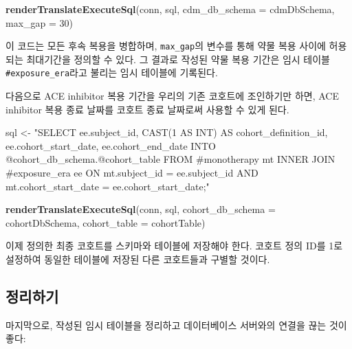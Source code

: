 \documentclass[11pt]{book}
\newenvironment{Shaded}{\begin{snugshade}}{\end{snugshade}}
\newcommand{\KeywordTok}[1]{\textcolor[rgb]{0.13,0.29,0.53}{\textbf{#1}}}
\newcommand{\DataTypeTok}[1]{\textcolor[rgb]{0.13,0.29,0.53}{#1}}
\newcommand{\DecValTok}[1]{\textcolor[rgb]{0.00,0.00,0.81}{#1}}
\newcommand{\StringTok}[1]{\textcolor[rgb]{0.31,0.60,0.02}{#1}}
\newcommand{\NormalTok}[1]{#1}
\theoremstyle{definition}
\theoremstyle{definition}
\theoremstyle{definition}
\theoremstyle{remark}
\begin{document}
\begin{Shaded}
\begin{Highlighting}[]
\KeywordTok{renderTranslateExecuteSql}\NormalTok{(conn,}
\NormalTok{                          sql,}
                          \DataTypeTok{cdm_db_schema =}\NormalTok{ cdmDbSchema,}
                          \DataTypeTok{max_gap =} \DecValTok{30}\NormalTok{)}
\end{Highlighting}
\end{Shaded}

이 코드는 모든 후속 복용을 병합하며, \texttt{max\_gap}의 변수를 통해
약물 복용 사이에 허용되는 최대기간을 정의할 수 있다. 그 결과로 작성된
약물 복용 기간은 임시 테이블 \texttt{\#exposure\_era}라고 불리는 임시
테이블에 기록된다.

다음으로 ACE inhibitor 복용 기간을 우리의 기존 코호트에 조인하기만 하면,
ACE inhibitor 복용 종료 날짜를 코호트 종료 날짜로써 사용할 수 있게 된다.

\begin{Shaded}
\begin{Highlighting}[]
\NormalTok{sql <-}\StringTok{ "SELECT ee.subject_id,}
\StringTok{  CAST(1 AS INT) AS cohort_definition_id,}
\StringTok{  ee.cohort_start_date,}
\StringTok{  ee.cohort_end_date}
\StringTok{INTO @cohort_db_schema.@cohort_table}
\StringTok{FROM #monotherapy mt}
\StringTok{INNER JOIN #exposure_era ee}
\StringTok{  ON mt.subject_id = ee.subject_id}
\StringTok{    AND mt.cohort_start_date = ee.cohort_start_date;"}

\KeywordTok{renderTranslateExecuteSql}\NormalTok{(conn,}
\NormalTok{                          sql,}
                          \DataTypeTok{cohort_db_schema =}\NormalTok{ cohortDbSchema,}
                          \DataTypeTok{cohort_table =}\NormalTok{ cohortTable)}
\end{Highlighting}
\end{Shaded}

이제 정의한 최종 코호트를 스키마와 테이블에 저장해야 한다. 코호트 정의
ID를 1로 설정하여 동일한 테이블에 저장된 다른 코호트들과 구별할 것이다.

\subsection{정리하기}

마지막으로, 작성된 임시 테이블을 정리하고 데이터베이스 서버와의 연결을
끊는 것이 좋다:
\end{document}
